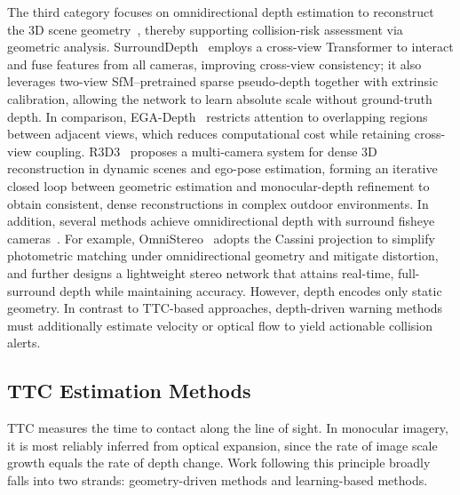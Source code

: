 \documentclass[journal]{IEEEtran}
\begin{document}
The third category focuses on omnidirectional depth estimation to reconstruct the 3D scene geometry~\cite{wei2023surrounddepth,shi2023ega,kim2022self,schmied2023r3d3,xie2023omnividar,deng2025omnistereo}, thereby supporting collision-risk assessment via geometric analysis. SurroundDepth~\cite{wei2023surrounddepth} employs a cross-view Transformer to interact and fuse features from all cameras, improving cross-view consistency; it also leverages two-view SfM–pretrained sparse pseudo-depth together with extrinsic calibration, allowing the network to learn absolute scale without ground-truth depth. In comparison, EGA-Depth~\cite{shi2023ega} restricts attention to overlapping regions between adjacent views, which reduces computational cost while retaining cross-view coupling. R3D3~\cite{schmied2023r3d3} proposes a multi-camera system for dense 3D reconstruction in dynamic scenes and ego-pose estimation, forming an iterative closed loop between geometric estimation and monocular-depth refinement to obtain consistent, dense reconstructions in complex outdoor environments. In addition, several methods achieve omnidirectional depth with surround fisheye cameras~\cite{xie2023omnividar,deng2025omnistereo}. For example, OmniStereo~\cite{deng2025omnistereo} adopts the Cassini projection to simplify photometric matching under omnidirectional geometry and mitigate distortion, and further designs a lightweight stereo network that attains real-time, full-surround depth while maintaining accuracy.
However, depth encodes only static geometry. In contrast to TTC-based approaches, depth-driven warning methods must additionally estimate velocity or optical flow to yield actionable collision alerts.

\subsection{TTC Estimation Methods}
\label{sec:related-work2}
TTC measures the time to contact along the line of sight. In monocular imagery, it is most reliably inferred from optical expansion, since the rate of image scale growth equals the rate of depth change. Work following this principle broadly falls into two strands: geometry-driven methods and learning-based methods. 
\end{document}
